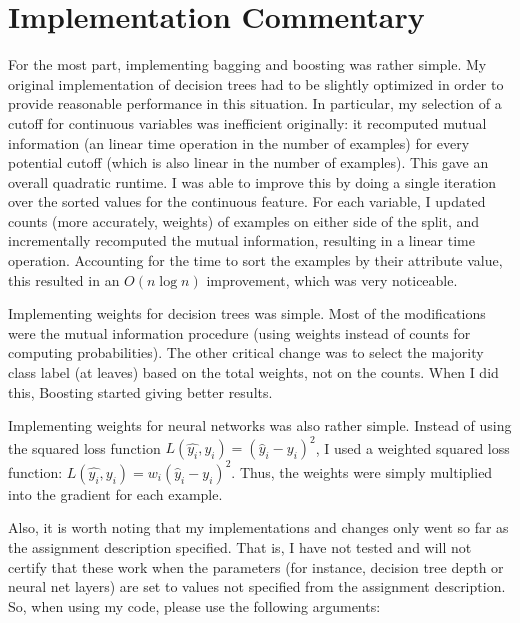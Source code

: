 \documentclass[fleqn]{homework}
\begin{document}
  \maketitle

  \section{Implementation Commentary}

  For the most part, implementing bagging and boosting was rather simple.  My
  original implementation of decision trees had to be slightly optimized in
  order to provide reasonable performance in this situation.  In particular, my
  selection of a cutoff for continuous variables was inefficient originally: it
  recomputed mutual information (an linear time operation in the number of
  examples) for every potential cutoff (which is also linear in the number of
  examples).  This gave an overall quadratic runtime.  I was able to improve
  this by doing a single iteration over the sorted values for the continuous
  feature.  For each variable, I updated counts (more accurately, weights) of
  examples on either side of the split, and incrementally recomputed the mutual
  information, resulting in a linear time operation.  Accounting for the time to
  sort the examples by their attribute value, this resulted in an $O(n \log n)$
  improvement, which was very noticeable.

  Implementing weights for decision trees was simple.  Most of the modifications
  were the mutual information procedure (using weights instead of counts for
  computing probabilities).  The other critical change was to select the
  majority class label (at leaves) based on the total weights, not on the
  counts.  When I did this, Boosting started giving better results.

  Implementing weights for neural networks was also rather simple.  Instead of
  using the squared loss function $L(\hat{y_i}, y_i) = (\hat{y}_i - y_i)^2$, I
  used a weighted squared loss function:
  $L(\hat{y_i}, y_i) = w_i (\hat{y}_i - y_i)^2$.  Thus, the weights were simply
  multiplied into the gradient for each example.

  Also, it is worth noting that my implementations and changes only went so far
  as the assignment description specified.  That is, I have not tested and will
  not certify that these work when the parameters (for instance, decision tree
  depth or neural net layers) are set to values not specified from the
  assignment description.  So, when using my code, please use the following
  arguments:
\end{document}
